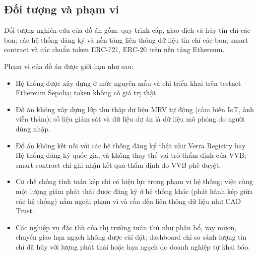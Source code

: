\subsection*{Đối tượng và phạm vi}
\label{subsec:phamvi}
Đối tượng nghiên cứu của đồ án gồm: quy trình cấp, giao dịch và hủy tín chỉ các-bon; các hệ thống đăng ký và nền tảng liên thông dữ liệu tín chỉ các-bon; smart contract và các chuẩn token ERC-721, ERC-20 trên nền tảng Ethereum.

Phạm vi của đồ án được giới hạn như sau:
\begin{itemize}
    \item Hệ thống được xây dựng ở mức nguyên mẫu và chỉ triển khai trên testnet Ethereum Sepolia; token không có giá trị thật.
    \item Đồ án không xây dựng lớp thu thập dữ liệu MRV tự động (cảm biến IoT, ảnh viễn thám); số liệu giám sát và dữ liệu dự án là dữ liệu mô phỏng do người dùng nhập.
    \item Đồ án không kết nối với các hệ thống đăng ký thật như Verra Registry hay Hệ thống đăng ký quốc gia, và không thay thế vai trò thẩm định của VVB; smart contract chỉ ghi nhận kết quả thẩm định do VVB phê duyệt.
    \item Cơ chế chống tính toán kép chỉ có hiệu lực trong phạm vi hệ thống; việc cùng một lượng giảm phát thải được đăng ký ở hệ thống khác (phát hành kép giữa các hệ thống) nằm ngoài phạm vi và cần đến liên thông dữ liệu như CAD Trust.
    \item Các nghiệp vụ đặc thù của thị trường tuân thủ như phân bổ, vay mượn, chuyển giao hạn ngạch không được cài đặt; dashboard chỉ so sánh lượng tín chỉ đã hủy với lượng phát thải hoặc hạn ngạch do doanh nghiệp tự khai báo.
\end{itemize}

